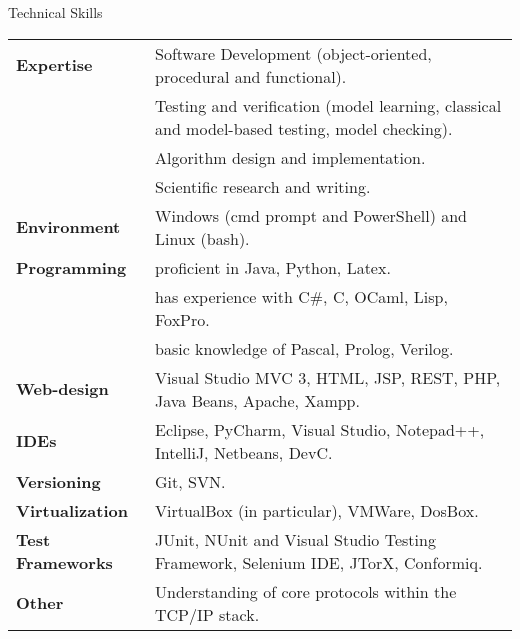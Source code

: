 \documentclass{resume} %
\begin{document}




\begin{rSection}{Technical Skills}
\begin{tabular}{@{} >{\bfseries}l @{  } >{\small}l}
\small{Expertise} 
& Software Development (object-oriented, procedural and functional). \\[0.2em]
& Testing and verification (model learning, classical and model-based testing, model checking). \\[0.2em]
& Algorithm design and implementation. \\[0.2em]
& Scientific research and writing. \\[0.7em]
\small{Environment} & Windows (cmd prompt and PowerShell) and Linux (bash). \\[0.7em] 
\small{Programming} & proficient in Java, Python, Latex. \\[0.2em]
& has experience with C\#, C, OCaml, Lisp, FoxPro.\\[0.2em]
& basic knowledge of Pascal, Prolog, Verilog.\\[0.7em]
\small{Web-design} & Visual Studio MVC 3, HTML, JSP, REST, PHP, Java Beans, Apache, Xampp. \\[0.7em]
\small{IDEs} & Eclipse, PyCharm, Visual Studio, Notepad++, IntelliJ, Netbeans, DevC. \\[0.7em]
\small{Versioning} & Git, SVN. \\[0.7em]
\small{Virtualization} & VirtualBox (in particular), VMWare, DosBox. \\[0.7em]
\small{Test Frameworks} & JUnit, NUnit and Visual Studio Testing Framework, Selenium IDE, JTorX, Conformiq. \\[0.7em]
\small{Other} & Understanding of core protocols within the TCP/IP stack. 
\end{tabular}
\end{rSection}
\end{document}
